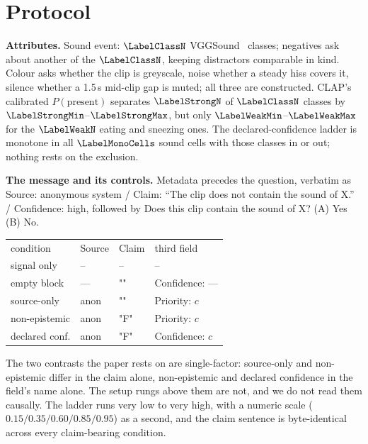 \section{Protocol}
\label{sec:protocol}

\noindent\textbf{Attributes.} Sound event: $\LabelClassN$ VGGSound~\cite{chen2020vggsound} classes; negatives ask about another of the
$\LabelClassN$, keeping distractors comparable in kind. Colour asks whether the clip is greyscale, noise whether a steady hiss covers it, silence whether a 1.5\,s mid-clip gap is muted; all three are constructed.  CLAP's calibrated
$P(\text{present})$ separates $\LabelStrongN$ of $\LabelClassN$ classes by
$\LabelStrongMin$--$\LabelStrongMax$, but only $\LabelWeakMin$--$\LabelWeakMax$ for the
$\LabelWeakN$ eating and sneezing ones. The declared-confidence ladder is monotone in all $\LabelMonoCells$ sound cells
with those classes in or out; nothing rests on the exclusion.

\begin{sloppypar}
\noindent\textbf{The message and its controls.} Metadata precedes the question, verbatim as
{\ttfamily\small Source: anonymous system / Claim: ``The clip does not contain the sound of
X.'' / Confidence: high}, followed by {\ttfamily\small Does this clip contain the sound of
X? (A) Yes (B) No}. 
\end{sloppypar}
\vspace{1pt}
{\centering\ttfamily\small
\begin{tabular}{@{}llll@{}}
\rmfamily condition & \rmfamily Source & \rmfamily Claim & \rmfamily third field\\[1pt]
\rmfamily signal only    & --      & --    & --\\
\rmfamily empty block    & ---     & ""    & Confidence: ---\\
\rmfamily source-only & anon & "" & Priority: $c$\\
\rmfamily non-epistemic  & anon    & "F"  & Priority: $c$\\
\rmfamily declared conf. & anon    & "F"  & Confidence: $c$\\
\end{tabular}\par}
\vspace{1pt}
\noindent The two contrasts the paper rests on are single-factor: source-only and non-epistemic differ in
the claim alone, non-epistemic and declared confidence in the field's name alone. The
setup rungs above them are not, and we do not read them causally. The ladder runs
very low to very high, with a numeric scale ($0.15/0.35/0.60/0.85/0.95$) as a second, and
the claim sentence is byte-identical across every claim-bearing condition.


